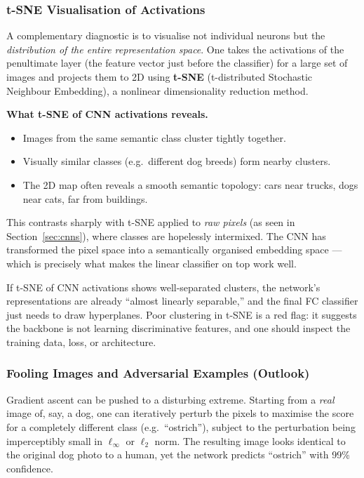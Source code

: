 \documentclass[11pt,a4paper]{article}
\begin{document}
\subsubsection{t-SNE Visualisation of Activations}

A complementary diagnostic is to visualise not individual neurons but the \emph{distribution of the entire representation space}.  One takes the activations of the penultimate layer (the feature vector just before the classifier) for a large set of images and projects them to 2D using \textbf{t-SNE} (t-distributed Stochastic Neighbour Embedding), a nonlinear dimensionality reduction method.

\textbf{What t-SNE of CNN activations reveals.}
\begin{itemize}
  \item Images from the same semantic class cluster tightly together.
  \item Visually similar classes (e.g.\ different dog breeds) form nearby clusters.
  \item The 2D map often reveals a smooth semantic topology: cars near trucks, dogs near cats, far from buildings.
\end{itemize}
This contrasts sharply with t-SNE applied to \emph{raw pixels} (as seen in Section~\ref{sec:cnns}), where classes are hopelessly intermixed.  The CNN has transformed the pixel space into a semantically organised embedding space — which is precisely what makes the linear classifier on top work well.

\begin{insightbox}
If t-SNE of CNN activations shows well-separated clusters, the network's representations are already ``almost linearly separable,'' and the final FC classifier just needs to draw hyperplanes.  Poor clustering in t-SNE is a red flag: it suggests the backbone is not learning discriminative features, and one should inspect the training data, loss, or architecture.
\end{insightbox}

\subsubsection{Fooling Images and Adversarial Examples (Outlook)}

Gradient ascent can be pushed to a disturbing extreme.  Starting from a \emph{real} image of, say, a dog, one can iteratively perturb the pixels to maximise the score for a completely different class (e.g.\ ``ostrich''), subject to the perturbation being imperceptibly small in $\ell_\infty$ or $\ell_2$ norm.  The resulting image looks identical to the original dog photo to a human, yet the network predicts ``ostrich'' with 99\% confidence.
\end{document}
